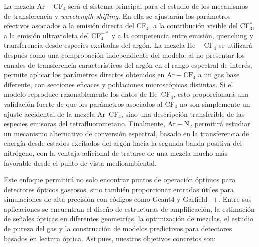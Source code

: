 \documentclass[12pt,a4paper]{article}
\newcommand{\N}{\mathrm{N}}
\newcommand{\He}{\mathrm{He}}
\newcommand{\Ar}{\mathrm{Ar}}
\newcommand{\CF}{\mathrm{CF}}
\begin{document}
La mezcla $\Ar-\CF_4$ será el sistema principal para el estudio de los mecanismos de transferencia y \emph{wavelength shifting}. En ella se ajustarán los parámetros efectivos asociados a la emisión directa del CF$_4$, a la contribución visible del CF$_3^*$, a la emisión ultravioleta del CF$_4^{+*}$ y a la competencia entre emisión, quenching y transferencia desde especies excitadas del argón. La mezcla $\He-\CF_4$ se utilizará después como una comprobación independiente del modelo: al no presentar los canales de transferencia característicos del argón en el rango espectral de interés, permite aplicar los parámetros directos obtenidos en $\Ar-\CF_4$ a un gas base diferente, con secciones eficaces y poblaciones microscópicas distintas. Si el modelo reproduce razonablemente los datos de He--CF$_4$, esto proporcionará una validación fuerte de que los parámetros asociados al CF$_4$ no son simplemente un ajuste accidental de la mezcla Ar--CF$_4$, sino una descripción transferible de las especies emisoras del tetrafluorometano. Finalmente, $\Ar-\N_2$ permitirá estudiar un mecanismo alternativo de conversión espectral, basado en la transferencia de energía desde estados excitados del argón hacia la segunda banda positiva del nitrógeno, con la ventaja adicional de tratarse de una mezcla mucho más favorable desde el punto de vista medioambiental.

Este enfoque permitirá no solo encontrar puntos de operación óptimos para detectores ópticos gaseosos, sino también proporcionar entradas útiles para simulaciones de alta precisión con códigos como Geant4 y Garfield++. Entre sus aplicaciones se encuentran el diseño de estructuras de amplificación, la estimación de señales ópticas en diferentes geometrías, la optimización de mezclas, el estudio de pureza del gas y la construcción de modelos predictivos para detectores basados en lectura óptica. Así pues, nuestros objetivos concretos son:
\end{document}
